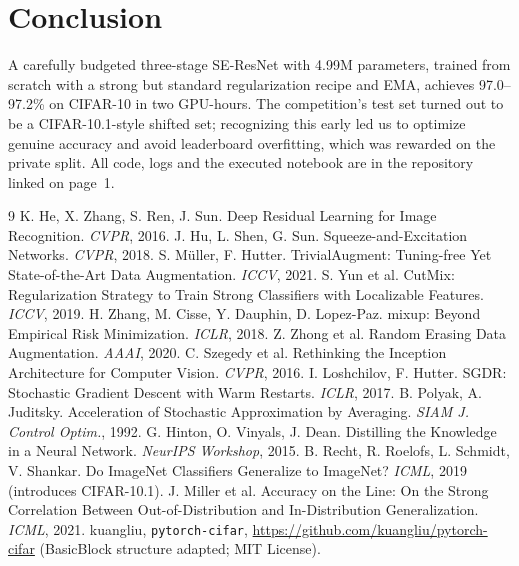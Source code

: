 \documentclass[11pt]{article}
\begin{document}
\section{Conclusion}
A carefully budgeted three-stage SE-ResNet with 4.99M parameters, trained from scratch with a strong but standard regularization recipe and EMA, achieves 97.0--97.2\% on CIFAR-10 in two GPU-hours. The competition's test set turned out to be a CIFAR-10.1-style shifted set; recognizing this early led us to optimize genuine accuracy and avoid leaderboard overfitting, which was rewarded on the private split. All code, logs and the executed notebook are in the repository linked on page~1.

\begin{thebibliography}{9}\small
{} K. He, X. Zhang, S. Ren, J. Sun. Deep Residual Learning for Image Recognition. \emph{CVPR}, 2016.
 J. Hu, L. Shen, G. Sun. Squeeze-and-Excitation Networks. \emph{CVPR}, 2018.
 S. M\"uller, F. Hutter. TrivialAugment: Tuning-free Yet State-of-the-Art Data Augmentation. \emph{ICCV}, 2021.
 S. Yun et al. CutMix: Regularization Strategy to Train Strong Classifiers with Localizable Features. \emph{ICCV}, 2019.
 H. Zhang, M. Cisse, Y. Dauphin, D. Lopez-Paz. mixup: Beyond Empirical Risk Minimization. \emph{ICLR}, 2018.
 Z. Zhong et al. Random Erasing Data Augmentation. \emph{AAAI}, 2020.
 C. Szegedy et al. Rethinking the Inception Architecture for Computer Vision. \emph{CVPR}, 2016.
 I. Loshchilov, F. Hutter. SGDR: Stochastic Gradient Descent with Warm Restarts. \emph{ICLR}, 2017.
 B. Polyak, A. Juditsky. Acceleration of Stochastic Approximation by Averaging. \emph{SIAM J. Control Optim.}, 1992.
 G. Hinton, O. Vinyals, J. Dean. Distilling the Knowledge in a Neural Network. \emph{NeurIPS Workshop}, 2015.
 B. Recht, R. Roelofs, L. Schmidt, V. Shankar. Do ImageNet Classifiers Generalize to ImageNet? \emph{ICML}, 2019 (introduces CIFAR-10.1).
 J. Miller et al. Accuracy on the Line: On the Strong Correlation Between Out-of-Distribution and In-Distribution Generalization. \emph{ICML}, 2021.
 kuangliu, \texttt{pytorch-cifar}, \url{https://github.com/kuangliu/pytorch-cifar} (BasicBlock structure adapted; MIT License).
\end{thebibliography}
\end{document}
